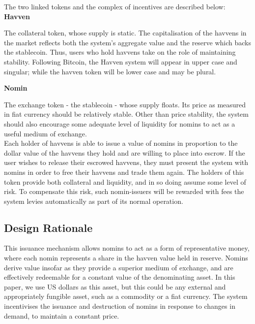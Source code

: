 \noindent The two linked tokens and the complex of incentives are described below: \\

\noindent \textbf{Havven}

\vspace{1mm}

\noindent The collateral token, whose supply is static.
The capitalisation of the havvens in the market reflects both the system's aggregate value and the reserve
which backs the stablecoin. Thus, users who hold havvens take on the role of maintaining stability.
Following Bitcoin, the Havven system will appear in upper case and singular; while the havven
token will be lower case and may be plural.

\vspace{2mm}

\noindent \textbf{Nomin}

\vspace{1mm}

\noindent The exchange token - the stablecoin - whose supply floats.
Its price as measured in fiat currency should be relatively stable.
Other than price stability, the system should also encourage some adequate level
of liquidity for nomins to act as a useful medium of exchange. \\

\noindent Each holder of havvens is able to issue a value of nomins in proportion to the dollar value
of the havvens they hold and are willing to place into escrow. If the user wishes to release their escrowed havvens, they must present the system with nomins in order to free their havvens and trade them again.
The holders of this token provide both collateral and liquidity, and in so doing assume some
level of risk. To compensate this risk, such nomin-issuers will be rewarded with fees the system levies
automatically as part of its normal operation. \\

\subsection{Design Rationale}

\noindent This issuance mechanism allows nomins to act as a form of representative money, where each nomin represents a share in the havven value held in reserve. Nomins derive value insofar as they provide a superior medium of exchange, and are effectively redeemable for a constant value of the denominating asset. In this paper, we use US dollars as this asset, but this could be any external and appropriately fungible asset, such as a commodity or a fiat currency. The system incentivises the issuance and destruction of nomins in response to changes in demand, to maintain a constant price. \\

